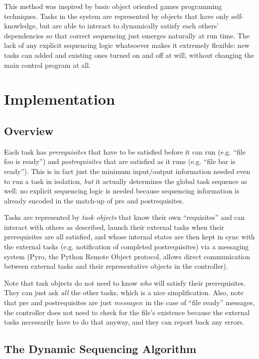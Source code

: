 \documentclass[12pt]{article}
\begin{document}
This method was inspired by basic object oriented games programming
techniques. Tasks in the system are represented by objects that have
only self-knowledge, but are able to interact to dynamically satisfy
each others' dependencies so that correct sequencing just emerges
naturally at run time.  The lack of any explicit sequencing logic
whatsoever makes it extremely flexible: new tasks can added and existing
ones turned on and off at will, without changing the main control
program at all.


\section{Implementation}

\subsection{Overview}

Each task has {\em prerequisites} that have to be satisfied before it
can run (e.g. ``file foo is ready'') and {\em postrequisites} that are
satisfied as it runs (e.g. ``file bar is ready''). This is in fact just
the minimum input/output information needed even to run a task in
isolation, {\em but} it actually determines the global task sequence as
well: no explicit sequencing logic is needed because sequencing
information is already encoded in the match-up of pre and
postrequisites. 

Tasks are represented by {\em task objects} that know their own
``requisites'' and can interact with others as described, launch their
external tasks when their prerequisites are all satisfied, and whose
internal states are then kept in sync with the external tasks (e.g.
notification of completed postrequisites) via a messaging system (Pyro,
the Python Remote Object protocol, allows direct communication between
external tasks and their representative objects in the controller). 

Note that task objects do not need to know {\em who} will satisfy their
prerequisites. They can just ask {\em all} the other tasks, which is a
nice simplification. Also, note that pre and postrequisites are just {\em
messages}: in the case of ``file ready'' messages, the controller does
not need to check for the file's existence because the external tasks
necessarily have to do that anyway, and they can report back any errors.


\subsection{The Dynamic Sequencing Algorithm}
\end{document}
